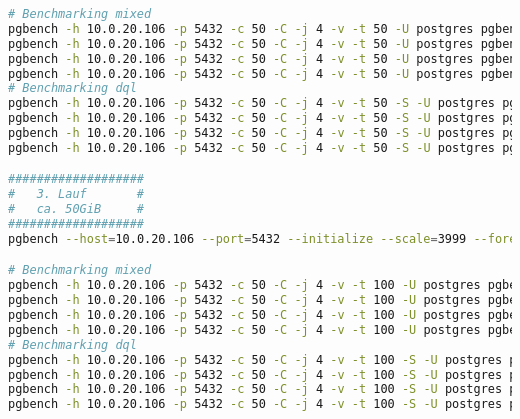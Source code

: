 \begin{flushleft}
\begin{lstlisting}[language=bash, caption=StackGres-Citus - Benchmarking-Commands,captionpos=b,label={lst:stackgres_citus-benchmarking-commands},breaklines=true]
# Benchmarking mixed
pgbench -h 10.0.20.106 -p 5432 -c 50 -C -j 4 -v -t 50 -U postgres pgbench_eval_bench > /home/itgramic/2_1_stackgres_mixed_benchmark.txt
pgbench -h 10.0.20.106 -p 5432 -c 50 -C -j 4 -v -t 50 -U postgres pgbench_eval_bench > /home/itgramic/2_2_stackgres_mixed_benchmark.txt
pgbench -h 10.0.20.106 -p 5432 -c 50 -C -j 4 -v -t 50 -U postgres pgbench_eval_bench > /home/itgramic/2_3_stackgres_mixed_benchmark.txt
pgbench -h 10.0.20.106 -p 5432 -c 50 -C -j 4 -v -t 50 -U postgres pgbench_eval_bench > /home/itgramic/2_4_stackgres_mixed_benchmark.txt
# Benchmarking dql
pgbench -h 10.0.20.106 -p 5432 -c 50 -C -j 4 -v -t 50 -S -U postgres pgbench_eval_bench > /home/itgramic/2_1_stackgres_dql_benchmark.txt
pgbench -h 10.0.20.106 -p 5432 -c 50 -C -j 4 -v -t 50 -S -U postgres pgbench_eval_bench > /home/itgramic/2_2_stackgres_dql_benchmark.txt
pgbench -h 10.0.20.106 -p 5432 -c 50 -C -j 4 -v -t 50 -S -U postgres pgbench_eval_bench > /home/itgramic/2_3_stackgres_dql_benchmark.txt
pgbench -h 10.0.20.106 -p 5432 -c 50 -C -j 4 -v -t 50 -S -U postgres pgbench_eval_bench > /home/itgramic/2_4_stackgres_dql_benchmark.txt

###################
#   3. Lauf       #
#   ca. 50GiB     #
###################
pgbench --host=10.0.20.106 --port=5432 --initialize --scale=3999 --foreign-keys --fillfactor=100 --username=dtgvpf  --username=postgres pgbench_eval_bench

# Benchmarking mixed
pgbench -h 10.0.20.106 -p 5432 -c 50 -C -j 4 -v -t 100 -U postgres pgbench_eval_bench > /home/itgramic/3_1_stackgres_mixed_benchmark.txt
pgbench -h 10.0.20.106 -p 5432 -c 50 -C -j 4 -v -t 100 -U postgres pgbench_eval_bench > /home/itgramic/3_2_stackgres_mixed_benchmark.txt
pgbench -h 10.0.20.106 -p 5432 -c 50 -C -j 4 -v -t 100 -U postgres pgbench_eval_bench > /home/itgramic/3_3_stackgres_mixed_benchmark.txt
pgbench -h 10.0.20.106 -p 5432 -c 50 -C -j 4 -v -t 100 -U postgres pgbench_eval_bench > /home/itgramic/3_4_stackgres_mixed_benchmark.txt
# Benchmarking dql
pgbench -h 10.0.20.106 -p 5432 -c 50 -C -j 4 -v -t 100 -S -U postgres pgbench_eval_bench > /home/itgramic/3_1_stackgres_dql_benchmark.txt
pgbench -h 10.0.20.106 -p 5432 -c 50 -C -j 4 -v -t 100 -S -U postgres pgbench_eval_bench > /home/itgramic/3_2_stackgres_dql_benchmark.txt
pgbench -h 10.0.20.106 -p 5432 -c 50 -C -j 4 -v -t 100 -S -U postgres pgbench_eval_bench > /home/itgramic/3_3_stackgres_dql_benchmark.txt
pgbench -h 10.0.20.106 -p 5432 -c 50 -C -j 4 -v -t 100 -S -U postgres pgbench_eval_bench > /home/itgramic/3_4_stackgres_dql_benchmark.txt



\end{lstlisting}
\end{flushleft}
